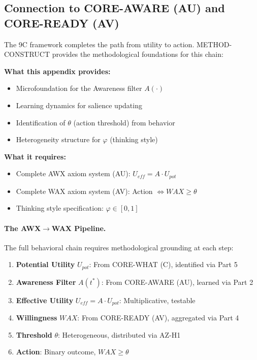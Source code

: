 \subsection{Connection to CORE-AWARE (AU) and CORE-READY (AV)}

The 9C framework completes the path from utility to action. METHOD-CONSTRUCT
provides the methodological foundations for this chain:

\begin{tcolorbox}[colback=yellow!5!white, colframe=yellow!75!black,
    title=Integration: METHOD-CONSTRUCT $\leftrightarrow$ CORE-AWARE/READY (AU, AV)]
\textbf{What this appendix provides:}
\begin{itemize}[nosep]
\item Microfoundation for the Awareness filter $A(\cdot)$
\item Learning dynamics for salience updating
\item Identification of $\theta$ (action threshold) from behavior
\item Heterogeneity structure for $\varphi$ (thinking style)
\end{itemize}

\textbf{What it requires:}
\begin{itemize}[nosep]
\item Complete AWX axiom system (AU): $U_{eff} = A \cdot U_{pot}$
\item Complete WAX axiom system (AV): Action $\Leftrightarrow WAX \geq \theta$
\item Thinking style specification: $\varphi \in [0,1]$
\end{itemize}
\end{tcolorbox}

\paragraph{The AWX$\to$WAX Pipeline.}
The full behavioral chain requires methodological grounding at each step:

\begin{enumerate}
\item \textbf{Potential Utility} $U_{pot}$: From CORE-WHAT (C), identified via Part 5
\item \textbf{Awareness Filter} $A(t^*)$: From CORE-AWARE (AU), learned via Part 2
\item \textbf{Effective Utility} $U_{eff} = A \cdot U_{pot}$: Multiplicative, testable
\item \textbf{Willingness} $WAX$: From CORE-READY (AV), aggregated via Part 4
\item \textbf{Threshold} $\theta$: Heterogeneous, distributed via AZ-H1
\item \textbf{Action}: Binary outcome, $WAX \geq \theta$
\end{enumerate}

